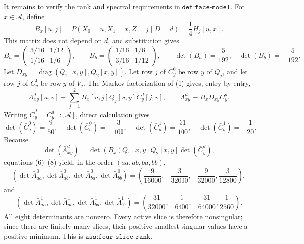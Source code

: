 It remains to verify the rank and spectral requirements in \(\texttt{def:face-model}\).  For \(x\in\mathcal A\), define
\[
B_x[u,j]=P(X_0=u,X_1=x,Z=j\mid D=d)=\frac14H_j[u,x].         \tag{5}
\]
This matrix does not depend on \(d\), and substitution gives
\[
B_a=\begin{pmatrix}3/16&1/12\\1/16&1/6\end{pmatrix},
\qquad
B_b=\begin{pmatrix}1/16&1/6\\3/16&1/12\end{pmatrix},
\qquad
\det(B_a)=\frac5{192},\quad \det(B_b)=-\frac5{192}.        \tag{6}
\]
Let \(D_{xy}=\operatorname{diag}(Q_1[x,y],Q_2[x,y])\).  Let row \(j\) of \(C_y^0\) be row \(y\) of \(Q_j\), and let row \(j\) of \(C_y^1\) be row \(y\) of \(V_j\).  The Markov factorization of (1) gives, entry by entry,
\[
A_{xy}^d[u,v]=\sum_{j=1}^2B_x[u,j]Q_j[x,y]C_y^d[j,v],
\qquad
A_{xy}^d=B_xD_{xy}C_y^d.                                    \tag{7}
\]
Writing \(\bar C_y^d=C_y^d[:,\mathcal A]\), direct calculation gives
\[
\det(\bar C_a^0)=\frac9{50},\quad
\det(\bar C_b^0)=-\frac3{100},\quad
\det(\bar C_a^1)=\frac{31}{100},\quad
\det(\bar C_b^1)=-\frac1{20}.                              \tag{8}
\]
Because
\[
\det(\bar A_{xy}^d)
=\det(B_x)Q_1[x,y]Q_2[x,y]\det(\bar C_y^d),                 \tag{9}
\]
equations (6)--(8) yield, in the order \((aa,ab,ba,bb)\),
\[
\left(\det\bar A_{aa}^0,\det\bar A_{ab}^0,
\det\bar A_{ba}^0,\det\bar A_{bb}^0\right)
=\left(\frac9{16000},-\frac3{32000},-\frac9{32000},
\frac3{12800}\right),                                      \tag{10}
\]
and
\[
\left(\det\bar A_{aa}^1,\det\bar A_{ab}^1,
\det\bar A_{ba}^1,\det\bar A_{bb}^1\right)
=\left(\frac{31}{32000},-\frac1{6400},-\frac{31}{64000},
\frac1{2560}\right).                                       \tag{11}
\]
All eight determinants are nonzero.  Every active slice is therefore nonsingular; since there are finitely many slices, their positive smallest singular values have a positive minimum.  This is \(\texttt{ass:four-slice-rank}\).

